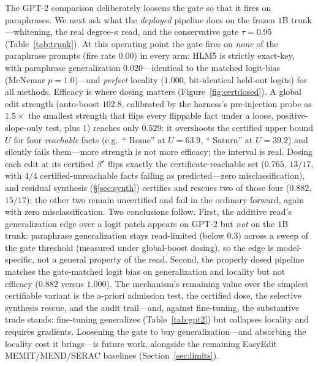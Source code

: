 \documentclass[11pt]{article}
\theoremstyle{remark}
\begin{document}
The GPT-2 comparison deliberately loosens the gate so that it fires on
paraphrases. We next ask what the \emph{deployed} pipeline does on the frozen
$1$B trunk---whitening, the real degree-$\kappa$ read, and the conservative gate
$\tau=0.95$ (Table~\ref{tab:trunk}). At this operating point the gate fires on
\emph{none} of the paraphrase prompts (fire rate $0.00$) in every arm: HLM5 is
strictly exact-key, with paraphrase generalization $0.020$---identical to the
matched logit-bias (McNemar $p=1.0$)---and \emph{perfect} locality ($1.000$,
bit-identical held-out logits) for all methods. Efficacy is where dosing
matters (Figure~\ref{fig:certdosed}). A global edit strength (auto-boost
$102.8$, calibrated by the harness's pre-injection probe as $1.5\times$ the
smallest strength that flips every flippable fact under a loose,
positive-slope-only test, plus $1$) reaches only $0.529$: it
overshoots the certified upper bound $U$ for four \emph{reachable} facts (e.g.\
`` Rome'' at $U=63.9$, `` Saturn'' at $U=39.2$) and silently fails them---more
strength is not more efficacy; the interval is real. Dosing each edit at its
certified $\beta^{\star}$ flips exactly the certificate-reachable set ($0.765$,
$13/17$, with $4/4$ certified-unreachable facts failing as predicted---zero
misclassification), and residual synthesis (\S\ref{sec:synth}) certifies and
rescues two of those four ($0.882$, $15/17$); the other two remain
uncertified and fail in the ordinary forward, again with zero
misclassification. Two conclusions follow. First, the additive read's
generalization edge over a logit patch appears on GPT-2 but \emph{not} on the
$1$B trunk: paraphrase generalization stays read-limited (below $0.3$) across a
sweep of the gate threshold (measured under global-boost dosing), so the edge is
model-specific, not a general property of the read. Second, the properly dosed
pipeline matches the gate-matched logit bias on generalization and locality but
not efficacy ($0.882$ versus $1.000$). The mechanism's remaining value over the
simplest certifiable variant is the a-priori admission test, the certified dose,
the selective synthesis rescue, and the audit trail---and,
against fine-tuning, the substantive trade stands: fine-tuning generalizes
(Table~\ref{tab:gpt2}) but collapses locality and requires gradients. Loosening
the gate to buy generalization---and absorbing the locality cost it brings---is
future work, alongside the remaining EasyEdit MEMIT/MEND/SERAC baselines
(Section~\ref{sec:limits}).
\end{document}
